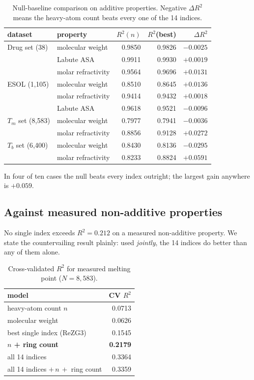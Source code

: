 \documentclass[11pt,a4paper]{article}
\theoremstyle{plain}
\begin{document}
\begin{table}[h]\centering\small
\caption{Null-baseline comparison on additive properties. Negative $\Delta R^2$ means the
heavy-atom count beats every one of the 14 indices.}
\begin{tabular}{llrrr}
\toprule
dataset & property & $R^2(n)$ & $R^2$(best) & $\Delta R^2$\\
\midrule
Drug set (38) & molecular weight & 0.9850 & 0.9826 & $-0.0025$\\
              & Labute ASA & 0.9911 & 0.9930 & $+0.0019$\\
              & molar refractivity & 0.9564 & 0.9696 & $+0.0131$\\
ESOL (1{,}105) & molecular weight & 0.8510 & 0.8645 & $+0.0136$\\
              & molar refractivity & 0.9414 & 0.9432 & $+0.0018$\\
              & Labute ASA & 0.9618 & 0.9521 & $-0.0096$\\
$T_m$ set (8{,}583) & molecular weight & 0.7977 & 0.7941 & $-0.0036$\\
              & molar refractivity & 0.8856 & 0.9128 & $+0.0272$\\
$T_b$ set (6{,}400) & molecular weight & 0.8430 & 0.8136 & $-0.0295$\\
              & molar refractivity & 0.8233 & 0.8824 & $+0.0591$\\
\bottomrule
\end{tabular}
\end{table}

In four of ten cases the null beats every index outright; the largest gain anywhere is
$+0.059$.

\subsection{Against measured non-additive properties}

No single index exceeds $R^2=0.212$ on a measured non-additive property. We state the
countervailing result plainly: used \emph{jointly}, the 14 indices do better than any of
them alone.

\begin{table}[h]\centering\small
\caption{Cross-validated $R^2$ for measured melting point ($N=8{,}583$).}
\begin{tabular}{lr}
\toprule
model & CV $R^2$\\
\midrule
heavy-atom count $n$ & 0.0713\\
molecular weight & 0.0626\\
best single index (ReZG3) & 0.1545\\
\textbf{$n$ + ring count} & \textbf{0.2179}\\
all 14 indices & 0.3364\\
all 14 indices $+\,n\,+$ ring count & 0.3359\\
\bottomrule
\end{tabular}
\end{table}
\end{document}
